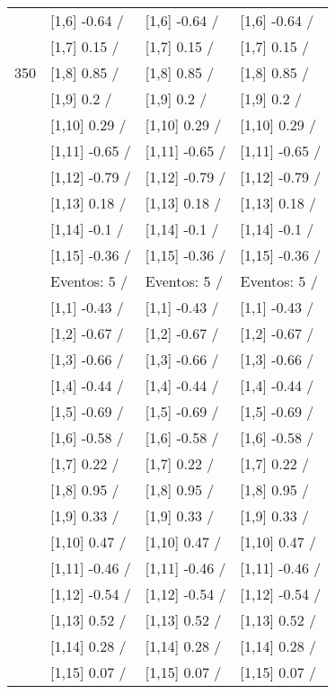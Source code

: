 \begin{table}
\begin{tabular}[t]{llll}
 & {}[1,6] -0.64  / & {}[1,6] -0.64  / & {}[1,6] -0.64  /\\
 & {}[1,7] 0.15  / & {}[1,7] 0.15  / & {}[1,7] 0.15  /\\
350 & {}[1,8] 0.85  / & {}[1,8] 0.85  / & {}[1,8] 0.85  /\\
\addlinespace
 & {}[1,9] 0.2  / & {}[1,9] 0.2  / & {}[1,9] 0.2  /\\
 & {}[1,10] 0.29  / & {}[1,10] 0.29  / & {}[1,10] 0.29  /\\
 & {}[1,11] -0.65  / & {}[1,11] -0.65  / & {}[1,11] -0.65  /\\
 & {}[1,12] -0.79  / & {}[1,12] -0.79  / & {}[1,12] -0.79  /\\
 & {}[1,13] 0.18  / & {}[1,13] 0.18  / & {}[1,13] 0.18  /\\
\addlinespace
 & {}[1,14] -0.1  / & {}[1,14] -0.1  / & {}[1,14] -0.1  /\\
 & {}[1,15] -0.36  / & {}[1,15] -0.36  / & {}[1,15] -0.36  /\\
 & Eventos:  5 / & Eventos:  5 / & Eventos:  5 /\\
 & {}[1,1] -0.43  / & {}[1,1] -0.43  / & {}[1,1] -0.43  /\\
 & {}[1,2] -0.67  / & {}[1,2] -0.67  / & {}[1,2] -0.67  /\\
\addlinespace
 & {}[1,3] -0.66  / & {}[1,3] -0.66  / & {}[1,3] -0.66  /\\
 & {}[1,4] -0.44  / & {}[1,4] -0.44  / & {}[1,4] -0.44  /\\
 & {}[1,5] -0.69  / & {}[1,5] -0.69  / & {}[1,5] -0.69  /\\
 & {}[1,6] -0.58  / & {}[1,6] -0.58  / & {}[1,6] -0.58  /\\
 & {}[1,7] 0.22  / & {}[1,7] 0.22  / & {}[1,7] 0.22  /\\
\addlinespace
500 & {}[1,8] 0.95  / & {}[1,8] 0.95  / & {}[1,8] 0.95  /\\
 & {}[1,9] 0.33  / & {}[1,9] 0.33  / & {}[1,9] 0.33  /\\
 & {}[1,10] 0.47  / & {}[1,10] 0.47  / & {}[1,10] 0.47  /\\
 & {}[1,11] -0.46  / & {}[1,11] -0.46  / & {}[1,11] -0.46  /\\
 & {}[1,12] -0.54  / & {}[1,12] -0.54  / & {}[1,12] -0.54  /\\
\addlinespace
 & {}[1,13] 0.52  / & {}[1,13] 0.52  / & {}[1,13] 0.52  /\\
 & {}[1,14] 0.28  / & {}[1,14] 0.28  / & {}[1,14] 0.28  /\\
 & {}[1,15] 0.07  / & {}[1,15] 0.07  / & {}[1,15] 0.07  /\\
\bottomrule
\end{tabular}
\end{table}

